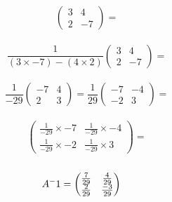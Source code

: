 \documentclass[a4paper,10pt]{article}
\begin{document}
      \begin{equation*}
        \begin{pmatrix}
          3 & 4\\2 & -7
        \end{pmatrix}
        =
      \end{equation*}
      \\
      \begin{equation*}
        \frac{1}{(3 \times -7) - (4 \times 2)}
        \begin{pmatrix}
          3 & 4\\2 & -7
        \end{pmatrix}
        =
      \end{equation*}
      \\
      \begin{equation*}
        \frac{1}{-29}
        \begin{pmatrix}
          -7 & 4\\2 & 3
        \end{pmatrix}
        =
        \frac{1}{29}
        \begin{pmatrix}
          -7 & -4\\-2 & 3
        \end{pmatrix}
        =
      \end{equation*}
      \\
      \begin{equation*}
        \begin{pmatrix}
          \frac{1}{-29} \times -7 & \frac{1}{-29} \times -4\\
          \frac{1}{-29} \times -2 & \frac{1}{-29} \times  3
        \end{pmatrix}
        =
      \end{equation*}
      \\
      \begin{equation*}
        A^-1 =
        \begin{pmatrix}
          \frac{7}{29} & \frac{4}{29}\\\frac{2}{29} & \frac{-3}{29}
        \end{pmatrix}
        \hspace{0.4cm}
      \end{equation*}

    \newpage
\end{document}
